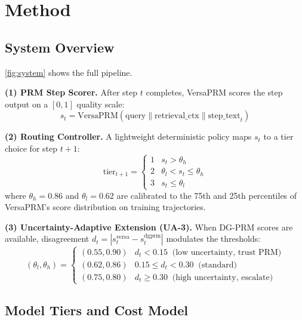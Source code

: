 \documentclass[sigconf,natbib=false]{acmart}
\begin{document}
\section{Method}
\label{sec:method}

\subsection{System Overview}

\cref{fig:system} shows the full pipeline.

\textbf{(1) PRM Step Scorer.}  After step $t$ completes, VersaPRM scores the
step output on a $[0,1]$ quality scale:
\begin{equation}
  s_t = \text{VersaPRM}(\text{query} \| \text{retrieval\_ctx} \| \text{step\_text}_t)
\end{equation}

\textbf{(2) Routing Controller.}  A lightweight deterministic policy maps $s_t$
to a tier choice for step $t{+}1$:
\begin{equation}
  \text{tier}_{t+1} = \begin{cases}
    1 & s_t > \theta_h \\
    2 & \theta_l < s_t \leq \theta_h \\
    3 & s_t \leq \theta_l
  \end{cases}
\end{equation}
where $\theta_h = 0.86$ and $\theta_l = 0.62$ are calibrated to the 75th and
25th percentiles of VersaPRM's score distribution on training trajectories.

\textbf{(3) Uncertainty-Adaptive Extension (UA-3).}  When DG-PRM scores are
available, disagreement $d_t = |s_t^\text{versa} - s_t^\text{dgprm}|$
modulates the thresholds:
\begin{equation}
  (\theta_l, \theta_h) = \begin{cases}
    (0.55, 0.90) & d_t < 0.15 \;\; \text{(low uncertainty, trust PRM)} \\
    (0.62, 0.86) & 0.15 \leq d_t < 0.30 \;\; \text{(standard)} \\
    (0.75, 0.80) & d_t \geq 0.30 \;\; \text{(high uncertainty, escalate)}
  \end{cases}
\end{equation}

\subsection{Model Tiers and Cost Model}
\end{document}
